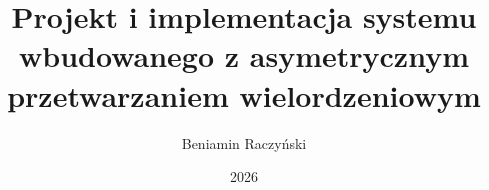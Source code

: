 \documentclass[thesis=inz,faculty=ee]{EE-dyplom}
\title{Projekt i implementacja systemu wbudowanego z asymetrycznym przetwarzaniem wielordzeniowym}
\author{Beniamin Raczyński}
\date{2026}
\begin{document}
    \frontpages
    

    
    
    
    
    
    
    
    

    \bibliografia

    
\end{document}
